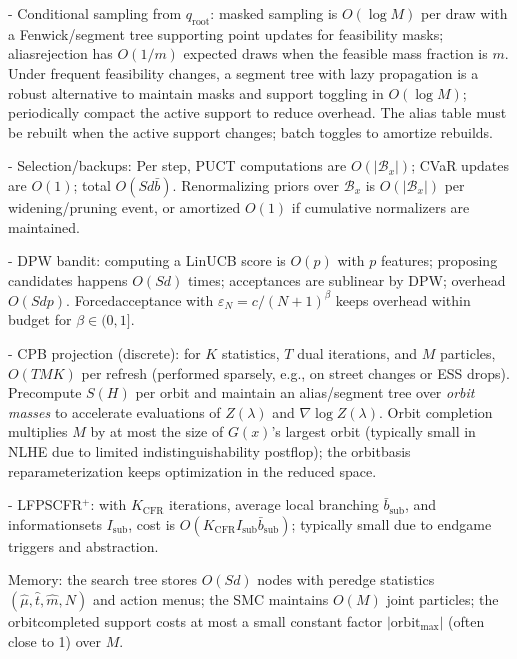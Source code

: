 \documentclass[10pt]{article}
\newcommand{\1}{\mathbf{1}}
\theoremstyle{plain}
\begin{document}
- Conditional sampling from $q_{\mathrm{root}}$: masked sampling is $O(\log M)$ per draw with a Fenwick/segment tree supporting point updates for feasibility masks; alias\textendash rejection has $O(1/m)$ expected draws when the feasible mass fraction is $m$. Under frequent feasibility changes, a segment tree with lazy propagation is a robust alternative to maintain masks and support toggling in $O(\log M)$; periodically compact the active support to reduce overhead. The alias table must be rebuilt when the active support changes; batch toggles to amortize rebuilds.

- Selection/backups: Per step, PUCT computations are $O(|\mathcal{B}_x|)$; CVaR updates are $O(1)$; total $O(Sd\bar b)$. Renormalizing priors over $\mathcal{B}_x$ is $O(|\mathcal{B}_x|)$ per widening/pruning event, or amortized $O(1)$ if cumulative normalizers are maintained.

- DPW bandit: computing a LinUCB score is $O(p)$ with $p$ features; proposing candidates happens $O(Sd)$ times; acceptances are sublinear by DPW; overhead $O(Sdp)$. Forced\textendash acceptance with $\varepsilon_N=c/(N+1)^\beta$ keeps overhead within budget for $\beta\in(0,1]$.

- CPB projection (discrete): for $K$ statistics, $T$ dual iterations, and $M$ particles, $O(TM K)$ per refresh (performed sparsely, e.g., on street changes or ESS drops). Precompute $S(H)$ per orbit and maintain an alias/segment tree over \emph{orbit masses} to accelerate evaluations of $Z(\lambda)$ and $\nabla \log Z(\lambda)$. Orbit completion multiplies $M$ by at most the size of $G(x)$'s largest orbit (typically small in NLHE due to limited indistinguishability postflop); the orbit\textendash basis reparameterization keeps optimization in the reduced space.

- LF\textendash PS\textendash CFR$^+$: with $K_{\text{CFR}}$ iterations, average local branching $\bar b_{\text{sub}}$, and information\textendash sets $I_{\text{sub}}$, cost is $O(K_{\text{CFR}} I_{\text{sub}}\bar b_{\text{sub}})$; typically small due to endgame triggers and abstraction.

Memory: the search tree stores $O(Sd)$ nodes with per\textendash edge statistics $(\hat\mu,\widehat t,\widehat m,N)$ and action menus; the SMC maintains $O(M)$ joint particles; the orbit\textendash completed support costs at most a small constant factor $|\mathrm{orbit}_{\max}|$ (often close to 1) over $M$.
\end{document}
